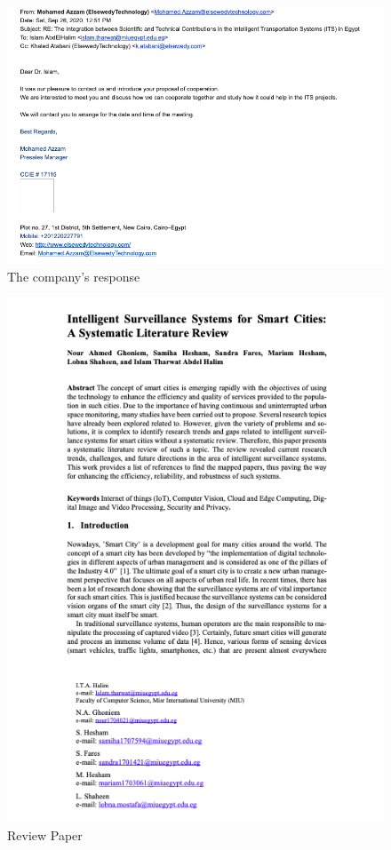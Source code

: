 \documentclass[12pt]{article}
\begin{document}
    \begin{figure}[!h]
    \includegraphics[width=13cm]{6.png}
    \caption{The company's response}
    \end{figure}
   \begin{figure}[htp]
    \includegraphics[width=15cm]{8.png}
    \caption{Review Paper}
 \end{figure}
\end{document}
